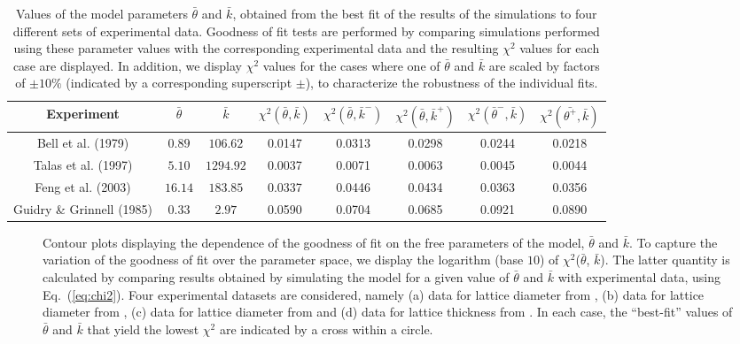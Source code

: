 \begin{center}
\begin{table*}[t]
\caption{Values of the model parameters $\bar{\theta}$ and $\bar{k}$, obtained from the best fit of the results of the simulations to four different sets of experimental data. Goodness of fit tests are performed by comparing simulations performed using these parameter values with the corresponding experimental data and the resulting $\chi^2$ values for each case are displayed. In addition, we display $\chi^2$ values for the cases where one of $\bar{\theta}$ and $\bar{k}$ are scaled by factors of $\pm10\%$ (indicated by a corresponding superscript $\pm$), to characterize the robustness of the individual fits.}
\centering
\begin{tabular}{|c|c|c|c|c|c|c|c|}
\hline
{Experiment}  &{$\bar{\theta}$} &{$\bar{k}$} & {$\chi^2(\bar{\theta},\bar{k})$} & {$\chi^2(\bar{\theta},\bar{k}^{-})$} & {$\chi^2(\bar{\theta},\bar{k}^{+})$} & {$\chi^2(\bar{\theta}^{-},\bar{k})$} & {$\chi^2(\bar{\theta^{+}},\bar{k})$}\\
\hline
{Bell et al. (1979)}        &{$0.89$}  &{$106.62$}  &{0.0147} &{0.0313} &{0.0298} &{0.0244} &{0.0218}\\
{Talas et al. (1997)}       &{$5.10$}  &{$1294.92$} &{0.0037} &{0.0071} &{0.0063} &{0.0045} &{0.0044}\\
{Feng et al. (2003)}        &{$16.14$} &{$183.85$}  &{0.0337} &{0.0446} &{0.0434} &{0.0363} &{0.0356}\\
{Guidry \& Grinnell (1985)} &{$0.33$}  &{$2.97$}    &{0.0590} &{0.0704} &{0.0685} &{0.0921} &{0.0890}\\
\hline
\end{tabular}
\label{tab:summary2}
\end{table*}
\end{center}
\begin{figure*}[ht]
\caption{
Contour plots displaying the dependence of the goodness of fit on the free parameters of the model, $\bar{\theta}$ and $\bar{k}$. To capture the variation of the goodness of fit over the parameter space, we display the logarithm (base $10$) of $\chi^2$($\bar{\theta}$, $\bar{k}$). The latter quantity is calculated by comparing results obtained by simulating the model for a given value of $\bar{\theta}$ and $\bar{k}$ with experimental data, using Eq.~(\ref{eq:chi2}). Four experimental datasets are considered, namely (a) data for lattice diameter from \citet{Bell1979}, (b) data for lattice diameter from \citet{Talas1997}, (c) data  for lattice diameter from \citet{Feng2003} and (d) data for lattice thickness from \citet{Guidry1985}. In each case, the ``best-fit'' values of $\bar{\theta}$ and $\bar{k}$ that yield the lowest $\chi^2$ are indicated by a cross within a circle.
}
\label{fig:contour}
\end{figure*}
